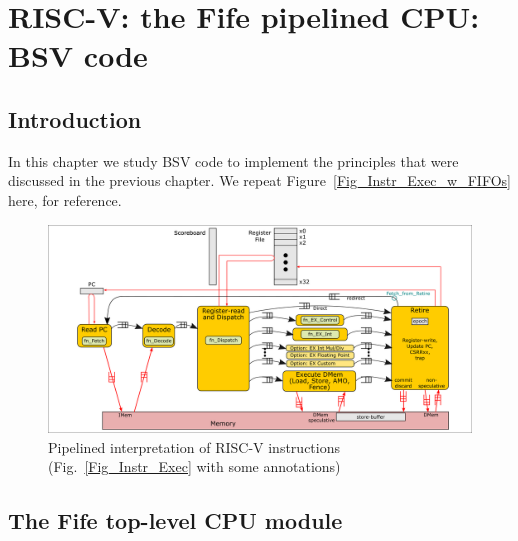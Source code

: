 

\chapter{RISC-V: the Fife pipelined CPU: BSV code}


\setcounter{page}{1}
\renewcommand{\thepage}{\arabic{chapter}-\arabic{page}}

\label{ch_Fife_code}


\section{Introduction}

In this chapter we study BSV code to implement the principles that
were discussed in the previous chapter.  We repeat
Figure~\ref{Fig_Instr_Exec_w_FIFOs} here, for reference.
\begin{figure}[htbp]
  \centerline{\includegraphics[width=6in,angle=0]{Figures/Fig_Instr_Exec_w_FIFOs}}
  \caption{\label{Fig_Instr_Exec_w_FIFOs_2}Pipelined interpretation of RISC-V instructions (Fig.~\ref{Fig_Instr_Exec} with some annotations)}
\end{figure}


\section{The Fife top-level CPU module}

